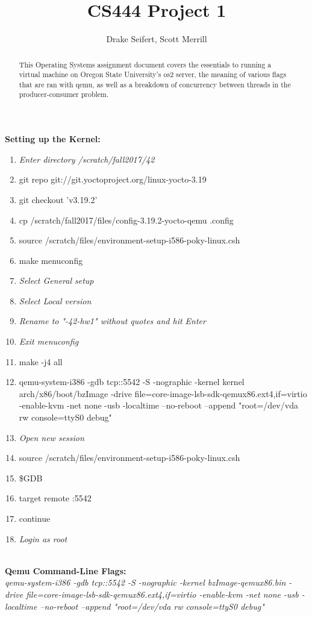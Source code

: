 \documentclass[10pt]{article}
\author{\LARGE Drake Seifert, Scott Merrill}
\title{\Huge CS444 Project 1}
\begin{document}
\maketitle
\begin{abstract}
	\large This Operating Systems assignment document covers the essentials to running a virtual machine on Oregon State University's os2 server, the meaning of various flags that are ran with qemu, as well as a breakdown of concurrency between threads in the producer-consumer problem.
\end{abstract}
\clearpage
\textbf{Setting up the Kernel:}
\begin{enumerate}
	\item \textit{Enter directory /scratch/fall2017/42}
	\item git repo git://git.yoctoproject.org/linux-yocto-3.19
	\item git checkout 'v3.19.2'
	\item cp /scratch/fall2017/files/config-3.19.2-yocto-qemu .config
	\item source /scratch/files/environment-setup-i586-poky-linux.csh
	\item make menuconfig
	\item \textit{Select General setup}
	\item \textit{Select Local version}
	\item \textit{Rename to "-42-hw1" without quotes and hit Enter}
	\item \textit{Exit menuconfig}
	\item make -j4 all
	\item qemu-system-i386 -gdb tcp::5542 -S -nographic -kernel  kernel arch/x86/boot/bzImage -drive file=core-image-lsb-sdk-qemux86.ext4,if=virtio -enable-kvm -net none -usb -localtime --no-reboot --append "root=/dev/vda rw console=ttyS0 debug"
	\item \textit{Open new session}
	\item source /scratch/files/environment-setup-i586-poky-linux.csh
	\item \$GDB
	\item target remote :5542
	\item continue
	\item \textit{Login as root}
\end{enumerate}
\textbf{\\Qemu Command-Line Flags:}\\
\textit{qemu-system-i386 -gdb tcp::5542 -S -nographic -kernel bzImage-qemux86.bin -drive file=core-image-lsb-sdk-qemux86.ext4,if=virtio -enable-kvm -net none -usb -localtime --no-reboot --append "root=/dev/vda rw console=ttyS0 debug"
}\\\\
\end{document}
